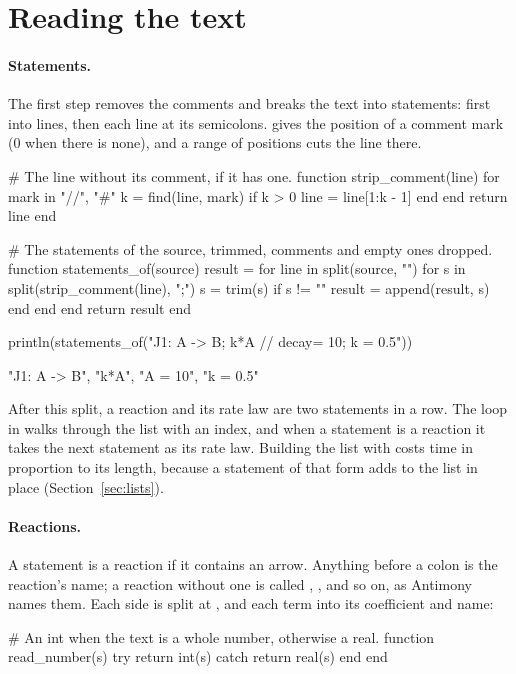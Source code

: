 \documentclass[11pt,a4paper,openany]{report}
\begin{document}
{{\section{Reading the text}

\paragraph{Statements.} The first step removes the comments and breaks the
text into statements: first into lines, then each line at its semicolons.
 gives the position of a comment mark (0 when there is none), and
a range of positions cuts the line there.

\begin{axon}
# The line without its comment, if it has one.
function strip_comment(line)
  for mark in {"//", "#"}
    k = find(line, mark)
    if k > 0
      line = line[1:k - 1]
    end
  end
  return line
end

# The statements of the source, trimmed, comments and empty ones dropped.
function statements_of(source)
  result = {}
  for line in split(source, "\n")
    for s in split(strip_comment(line), ";")
      s = trim(s)
      if s != ""
        result = append(result, s)
      end
    end
  end
  return result
end

println(statements_of("J1: A -> B; k*A   // decay\nA = 10; k = 0.5"))
\end{axon}
\begin{axonout}
{"J1: A -> B", "k*A", "A = 10", "k = 0.5"}
\end{axonout}

After this split, a reaction and its rate law are two statements in a row.
The loop in  walks through the list with an index, and when a
statement is a reaction it takes the next statement as its rate law.
Building the list with  costs time in
proportion to its length, because a statement of that form adds to the list
in place (Section~\ref{sec:lists}).

\paragraph{Reactions.} A statement is a reaction if it contains an arrow.
Anything before a colon is the reaction's name; a reaction without one is
called , , and so on, as Antimony names them. Each side
is split at \code{+}, and each term into its coefficient and name:

\begin{axon}
# An int when the text is a whole number, otherwise a real.
function read_number(s)
  try
    return int(s)
  catch
    return real(s)
  end
end


\end{axon}}}
\end{document}
